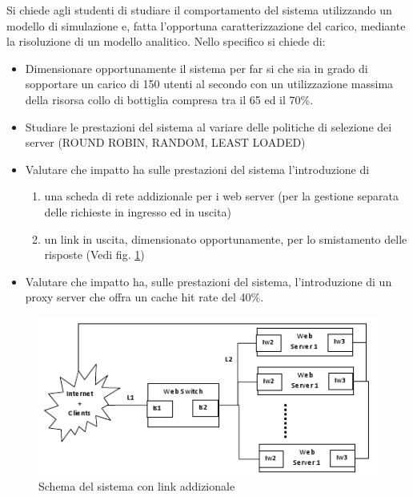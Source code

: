 Si chiede agli studenti di studiare il comportamento del sistema utilizzando un modello di simulazione e, fatta l’opportuna caratterizzazione del carico, mediante la risoluzione di un modello analitico. Nello specifico si chiede di: 
\begin{itemize}
	\item Dimensionare opportunamente il sistema per far si che sia in grado di sopportare un carico di 150 utenti al secondo con un utilizzazione massima della risorsa collo di bottiglia compresa tra il 65 ed il 70\%.
	\item Studiare le prestazioni del sistema al variare delle politiche di selezione dei server (ROUND ROBIN, RANDOM, LEAST LOADED) 
	\item Valutare che impatto ha sulle prestazioni del sistema l’introduzione di 
	\begin{enumerate}
		\item una scheda di rete addizionale per i web server (per la gestione separata delle richieste in ingresso ed in uscita)
		\item un link in uscita, dimensionato opportunamente, per lo smistamento delle risposte (Vedi fig. \ref{schema2}) 
	\end{enumerate}
	\item Valutare che impatto ha, sulle prestazioni del sistema, l’introduzione di un proxy server che offra un cache hit rate del 40\%.
\end{itemize}
\begin{figure}[H]
\begin{center}
\includegraphics[scale=1.2]{etc/schema2.png}
\caption{Schema del sistema con link addizionale}
\label{schema2}
\end{center}
\end{figure}
